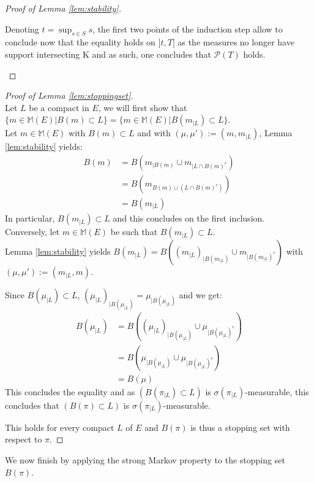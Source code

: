 \documentclass{article} %
\newcommand{\1}{\mathbbm{1}} %
\begin{document}
\begin{as}
\begin{proof}[Proof of Lemma \ref{lem:stability}]
\begin{itemize}
    Denoting $t = \sup_{s \in S} s$, the first two points of the induction step allow to conclude now that the equality holds on $]t, T]$ as the measures no longer have support intersecting K and as such, one concludes that $\mathcal{P}(T)$ holds.
    \end{itemize}
\end{proof}

\stoppingset*

\begin{proof}[Proof of Lemma \ref{lem:stoppingset}]
    \leavevmode \\
    Let $L$ be a compact in $E$, we will first show that $\{ m \in \mathbb{M}(E) | B(m) \subset L \} = \{ m \in \mathbb{M}(E) | B(m_{|L}) \subset L \}$.\\
    Let $m \in \mathbb{M}(E)$ with $B(m) \subset L$ and with $(\mu,\mu') := (m,m_{|L})$, Lemma \ref{lem:stability} yields:
    \begin{align*}
        B(m) &= B(m_{|B(m)} \cup m_{|L \cap B(m)^c}) \\
        &= B(m_{B(m) \cup (L \cap B(m)^c)}) \\
        &= B(m_{|L})
    \end{align*}
    In particular, $B(m_{|L}) \subset L$ and this concludes on the first inclusion.\\
    Conversely, let $m \in \mathbb{M}(E)$ be such that $B(m_{|L}) \subset L$.\\
    Lemma \ref{lem:stability} yields $B(m_{|L}) = B((m_{|L})_{|B(m_{|L})} \cup m_{|B(m_{|L})^c})$ with $(\mu, \mu') := (m_{|L}, m)$.

    Since $B(\mu_{|L}) \subset L$, $(\mu_{|L})_{|B(\mu_{|L})} = \mu_{|B(\mu_{|L})}$ and we get:
    \begin{align*}
        B(\mu_{|L}) &= B((\mu_{|L})_{|B(\mu_{|L})} \cup \mu_{|B(\mu_{|L})^c}) \\
        &= B(\mu_{|B(\mu_{|L})} \cup  \mu_{|B(\mu_{|L})^c}) \\
        &= B(\mu)
    \end{align*}
    This concludes the equality and as $(B(\pi_{|L}) \subset L)$ is $\sigma(\pi_{|L})$-measurable, this concludes that $(B(\pi) \subset L)$ is $\sigma(\pi_{|L})$-measurable.

    This holds for every compact $L$ of $E$ and $B(\pi)$ is thus a stopping set with respect to $\pi$.
\end{proof}

We now finish by applying the strong Markov property to the stopping set $B(\pi)$.


\end{as}
\end{document}
